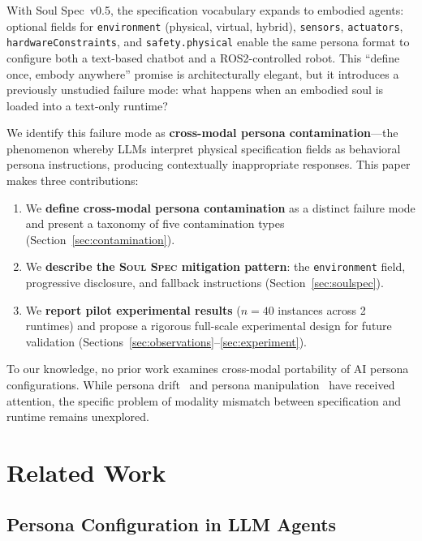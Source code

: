 \documentclass[manuscript,screen,nonacm]{acmart}
\begin{document}
With Soul Spec~v0.5, the specification vocabulary expands to embodied agents: optional fields for \texttt{environment} (physical, virtual, hybrid), \texttt{sensors}, \texttt{actuators}, \texttt{hardwareConstraints}, and \texttt{safety.physical} enable the same persona format to configure both a text-based chatbot and a ROS2-controlled robot.
This ``define once, embody anywhere'' promise is architecturally elegant, but it introduces a previously unstudied failure mode: what happens when an embodied soul is loaded into a text-only runtime?

We identify this failure mode as \textbf{cross-modal persona contamination}---the phenomenon whereby LLMs interpret physical specification fields as behavioral persona instructions, producing contextually inappropriate responses.
This paper makes three contributions:

\begin{enumerate}
    \item We \textbf{define cross-modal persona contamination} as a distinct failure mode and present a taxonomy of five contamination types (Section~\ref{sec:contamination}).
    \item We \textbf{describe the \textsc{Soul Spec} mitigation pattern}: the \texttt{environment} field, progressive disclosure, and fallback instructions (Section~\ref{sec:soulspec}).
    \item We \textbf{report pilot experimental results} ($n=40$ instances across 2 runtimes) and propose a rigorous full-scale experimental design for future validation (Sections~\ref{sec:observations}--\ref{sec:experiment}).
\end{enumerate}

To our knowledge, no prior work examines cross-modal portability of AI persona configurations.
While persona drift~\cite{wang2024persona_drift} and persona manipulation~\cite{deshpande2023toxicity} have received attention, the specific problem of modality mismatch between specification and runtime remains unexplored.


\section{Related Work}
\label{sec:related}

\subsection{Persona Configuration in LLM Agents}
\end{document}
